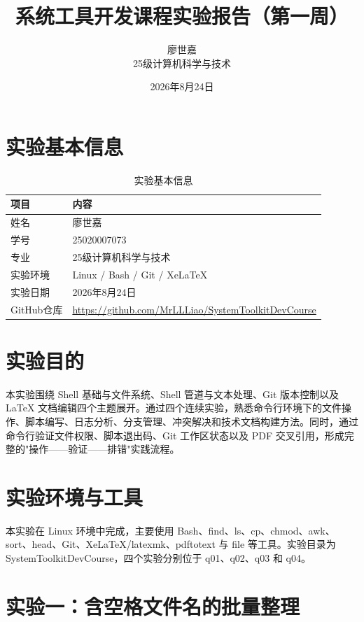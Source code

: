 \documentclass[UTF8]{ctexart}
\title{\textbf{系统工具开发课程实验报告（第一周）}}
\author{廖世嘉 \quad 25020007073 \\ 25级计算机科学与技术}
\date{2026年8月24日}
\begin{document}
\maketitle
\tableofcontents
\newpage

\section{实验基本信息}

\begin{table}[htbp]
\centering
\caption{实验基本信息}
\label{tab:info}
\begin{tabular}{ll}
\toprule
项目 & 内容 \\
\midrule
姓名 & 廖世嘉 \\
学号 & 25020007073 \\
专业 & 25级计算机科学与技术 \\
实验环境 & Linux / Bash / Git / XeLaTeX \\
实验日期 & 2026年8月24日 \\
GitHub仓库 & \href{https://github.com/MrLLLiao/SystemToolkitDevCourse}{https://github.com/MrLLLiao/SystemToolkitDevCourse} \\
\bottomrule
\end{tabular}
\end{table}

\section{实验目的}

本实验围绕 Shell 基础与文件系统、Shell 管道与文本处理、Git 版本控制以及 LaTeX 文档编辑四个主题展开。通过四个连续实验，熟悉命令行环境下的文件操作、脚本编写、日志分析、分支管理、冲突解决和技术文档构建方法。同时，通过命令行验证文件权限、脚本退出码、Git 工作区状态以及 PDF 交叉引用，形成完整的"操作——验证——排错"实践流程。

\section{实验环境与工具}

本实验在 Linux 环境中完成，主要使用 Bash、find、ls、cp、chmod、awk、sort、head、Git、XeLaTeX/latexmk、pdftotext 与 file 等工具。实验目录为 SystemToolkitDevCourse，四个实验分别位于 q01、q02、q03 和 q04。

\section{实验一：含空格文件名的批量整理}
\end{document}
